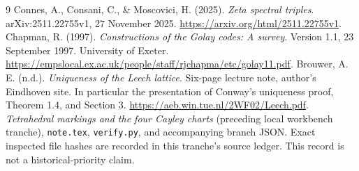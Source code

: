 \documentclass[11pt,reqno]{amsart}
\theoremstyle{definition}\newtheorem{definition}[theorem]{Definition}
\theoremstyle{remark}\newtheorem{remark}[theorem]{Remark}
\begin{document}
\begin{thebibliography}{9}
 Connes, A., Consani, C., \& Moscovici, H. (2025).
\emph{Zeta spectral triples}. arXiv:2511.22755v1, 27 November 2025.
\url{https://arxiv.org/html/2511.22755v1}.
 Chapman, R. (1997). \emph{Constructions of the Golay codes: A survey}. Version 1.1, 23 September 1997. University of Exeter.
\url{https://empslocal.ex.ac.uk/people/staff/rjchapma/etc/golay11.pdf}.
 Brouwer, A. E. (n.d.). \emph{Uniqueness of the Leech lattice}. Six-page lecture note, author's Eindhoven site. In particular the presentation of Conway's uniqueness proof, Theorem 1.4, and Section 3.
\url{https://aeb.win.tue.nl/2WF02/Leech.pdf}.
 \emph{Tetrahedral markings and the four Cayley charts} (preceding local workbench tranche), \texttt{note.tex}, \texttt{verify.py}, and accompanying branch JSON. Exact inspected file hashes are recorded in this tranche's source ledger. This record is not a historical-priority claim.
\end{thebibliography}
\end{document}
